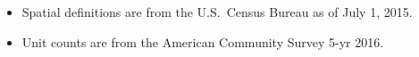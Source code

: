 \begin{itemize}
\item Spatial definitions are from the U.S.~Census Bureau as of July 1, 2015.
\item Unit counts are from the American Community Survey 5-yr 2016.
\end{itemize}
